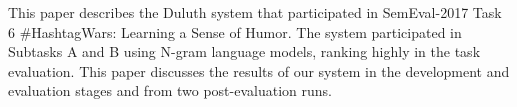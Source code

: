 This paper describes the Duluth system that participated in SemEval-2017 Task 6 \#HashtagWars: Learning a Sense of Humor. The system participated in Subtasks A and B using N-gram language models, ranking highly in the task evaluation. This paper discusses the results of our system in the development and evaluation stages and from two post-evaluation runs.

